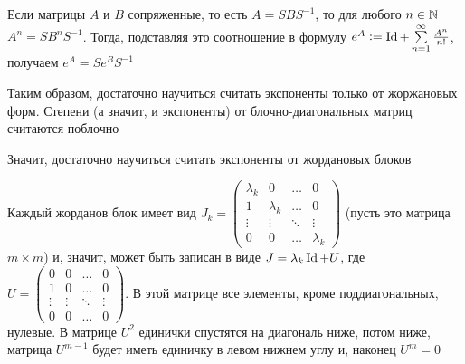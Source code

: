 \documentclass[12pt]{article}
\begin{document}
\begin{nota}{}
    Если матрицы $A$ и $B$ сопряженные, то есть $A = SBS^{-1}$, то для любого $n \in \mathbb N$ $A^n = SB^nS^{-1}$. Тогда, подставляя это соотношение в формулу $e^A := \operatorname{Id} + \sum\limits_{n = 1}^\infty \frac{A^n}{n!}$, получаем $e^A = Se^BS^{-1}$

    Таким образом, достаточно научиться считать экспоненты только от жоржановых форм. Степени (а значит, и экспоненты) от блочно-диагональных матриц считаются поблочно 

    Значит, достаточно научиться считать экспоненты от жордановых блоков 

    Каждый жорданов блок имеет вид $J_k = \begin{pmatrix}
        \lambda_k & 0 & \ldots & 0 \\
        1 & \lambda_k & \ldots & 0 \\
        \vdots & \vdots & \ddots & \vdots \\
        0 & 0 & \ldots & \lambda_k
    \end{pmatrix}$ (пусть это матрица $m \times m$) и, значит, может быть записан в виде $J = \lambda_k \operatorname{Id} + U$, где $U = \begin{pmatrix}
        0 & 0 & \ldots & 0 \\
        1 & 0 & \ldots & 0 \\
        \vdots & \vdots & \ddots & \vdots \\
        0 & 0 & \ldots & 0
    \end{pmatrix}$. В этой матрице все элементы, кроме поддиагональных, нулевые. В матрице $U^2$ единички спустятся на диагональ ниже, потом ниже, матрица $U^{m - 1}$ будет иметь единичку в левом нижнем углу и, наконец $U^m = 0$
\end{nota}
\end{document}
